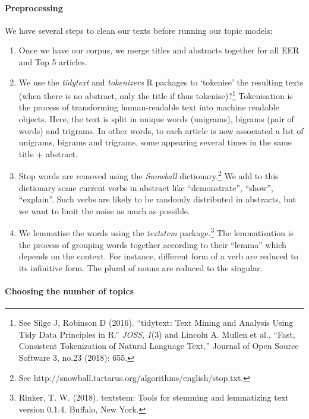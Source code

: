 \documentclass[]{elsarticle} %
\providecommand{\tightlist}{%
  \setlength{\itemsep}{0pt}\setlength{\parskip}{0pt}}
\begin{document}
\hypertarget{preprocessing}{%
\paragraph*{Preprocessing}\label{preprocessing}}

We have several steps to clean our texts before running our topic
models:

\begin{enumerate}
\def\labelenumi{\arabic{enumi}.}
\tightlist
\item
  Once we have our corpus, we merge titles and abstracts together for
  all EER and Top 5 articles.
\item
  We use the \emph{tidytext} and \emph{tokenizers} R packages to
  `tokenise' the resulting texts (when there is no abstract, only the
  title if thus tokenise)?\footnote{See Silge J, Robinson D (2016).
    ``tidytext: Text Mining and Analysis Using Tidy Data Principles in
    R.'' \emph{JOSS}, \emph{1}(3) and Lincoln A. Mullen et al., ``Fast,
    Consistent Tokenization of Natural Language Text,'' Journal of Open
    Source Software 3, no.23 (2018): 655.} Tokenisation is the process
  of transforming human-readable text into machine readable objects.
  Here, the text is split in unique words (unigrams), bigrams (pair of
  words) and trigrams. In other words, to each article is now associated
  a list of unigrams, bigrams and trigrams, some appearing several times
  in the same title + abstract.
\item
  Stop words are removed using the \emph{Snowball}
  dictionary.\footnote{See
    http://snowball.tartarus.org/algorithms/english/stop.txt.} We add to
  this dictionary some current verbs in abstract like ``demonstrate'',
  ``show'', ``explain''. Such verbs are likely to be randomly
  distributed in abstracts, but we want to limit the noise as much as
  possible.
\item
  We lemmatise the words using the \emph{textstem} package.\footnote{Rinker,
    T. W. (2018). textstem: Tools for stemming and lemmatizing text
    version 0.1.4. Buffalo, New York.} The lemmatisation is the process
  of grouping words together according to their ``lemma'' which depends
  on the context. For instance, different form of a verb are reduced to
  its infinitive form. The plural of nouns are reduced to the singular.
\end{enumerate}

\hypertarget{choosing-the-number-of-topics}{%
\paragraph*{Choosing the number of
topics}\label{choosing-the-number-of-topics}}
\end{document}
